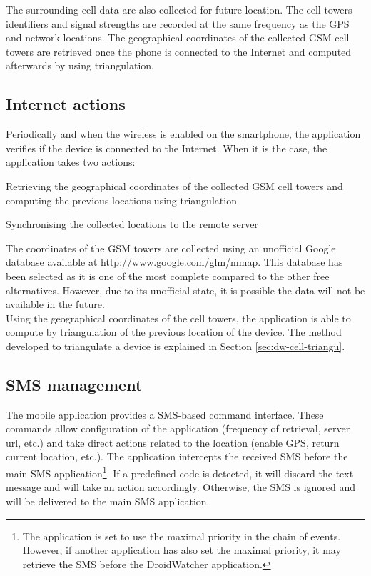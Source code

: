 The surrounding cell data are also collected for future location.
The cell towers identifiers and signal strengths are recorded at the same frequency as the GPS and network locations.
The geographical coordinates of the collected GSM cell towers are retrieved once the phone is connected to the Internet and computed afterwards by using triangulation.

\subsection{Internet actions}
\label{sec:dw-internet-actions}

Periodically and when the wireless is enabled on the smartphone, the application verifies if the device is connected to the Internet.
When it is the case, the application takes two actions:

\begin{itemizealt}
\item Retrieving the geographical coordinates of the collected GSM cell towers and computing the previous locations using triangulation
\item Synchronising the collected locations to the remote server
\end{itemizealt}

The coordinates of the GSM towers are collected using an unofficial Google database available at \url{http://www.google.com/glm/mmap}.
This database has been selected as it is one of the most complete compared to the other free alternatives.
However, due to its unofficial state, it is possible the data will not be available in the future.\\

Using the geographical coordinates of the cell towers, the application is able to compute by triangulation of the previous location of the device.
The method developed to triangulate a device is explained in Section \ref{sec:dw-cell-triangu}.

\subsection{SMS management}
\label{sec:dw-sms-manag}

The mobile application provides a SMS-based command interface.
These commands allow configuration of the application (frequency of retrieval, server url, etc.) and take direct actions related to the location (enable GPS, return current location, etc.).
The application intercepts the received SMS before the main SMS application\footnote{The application is set to use the maximal priority in the chain of events. However, if another application has also set the maximal priority, it may retrieve the SMS before the DroidWatcher application.}.
If a predefined code is detected, it will discard the text message and will take an action accordingly.
Otherwise, the SMS is ignored and will be delivered to the main SMS application.\\

